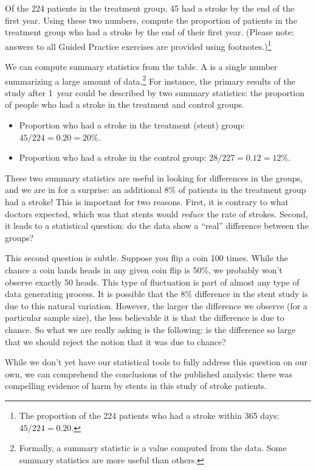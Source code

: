\begin{exercise}
Of the 224 patients in the treatment group, 45 had a stroke by the end of the first year. Using these two numbers, compute the proportion of patients in the treatment group who had a stroke by the end of their first year. (Please note: answers to all Guided Practice exercises are provided using footnotes.)\footnote{The proportion of the 224 patients who had a stroke within 365 days: $45/224 = 0.20$.}
\end{exercise}

We can compute summary statistics from the table. A  is a single number summarizing a large amount of data.\footnote{Formally, a summary statistic is a value computed from the data. Some summary statistics are more useful than others.} For instance, the primary results of the study after 1~year could be described by two summary statistics: the proportion of people who had a stroke in the treatment and control groups.
\begin{itemize}
\setlength{\itemsep}{0mm}
\item[] Proportion who had a stroke in the treatment (stent) group: $45/224 = 0.20 = 20\%$.
\item[] Proportion who had a stroke in the control group: $28/227 = 0.12 = 12\%$.
\end{itemize}
These two summary statistics are useful in looking for differences in the groups, and we are in for a surprise: an additional 8\% of patients in the treatment group had a stroke! This is important for two reasons. First, it is contrary to what doctors expected, which was that stents would \emph{reduce} the rate of strokes. Second, it leads to a statistical question: do the data show a ``real'' difference between the groups?

This second question is subtle. Suppose you flip a coin 100 times. While the chance a coin lands heads in any given coin flip is 50\%, we probably won't observe exactly 50 heads. This type of fluctuation is part of almost any type of data generating process. It is possible that the 8\% difference in the stent study is due to this natural variation. However, the larger the difference we observe (for a particular sample size), the less believable it is that the difference is due to chance. So what we are really asking is the following: is the difference so large that we should reject the notion that it was due to chance?

While we don't yet have our statistical tools to fully address this question on our own, we can comprehend the conclusions of the published analysis: there was compelling evidence of harm by stents in this study of stroke patients.

